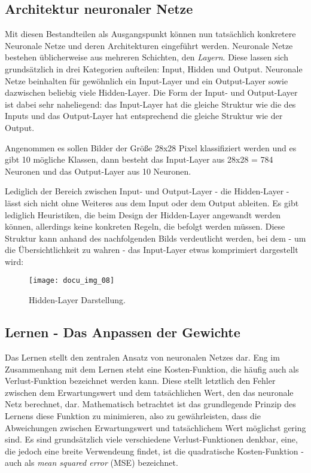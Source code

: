 \subsection{Architektur neuronaler Netze}

Mit diesen Bestandteilen als Ausgangspunkt können nun tatsächlich konkretere Neuronale Netze und deren Architekturen
eingeführt werden. Neuronale Netze bestehen üblicherweise aus mehreren Schichten, den \textit{Layern}. Diese lassen
sich grundsätzlich in drei Kategorien aufteilen: Input, Hidden und Output. Neuronale Netze beinhalten für gewöhnlich
ein Input-Layer und ein Output-Layer sowie dazwischen beliebig viele Hidden-Layer. Die Form der Input- und Output-Layer
ist dabei sehr naheliegend: das Input-Layer hat die gleiche Struktur wie die des Inputs und das Output-Layer hat
entsprechend die gleiche Struktur wie der Output.

Angenommen es sollen Bilder der Größe 28x28 Pixel klassifiziert werden und es gibt 10 mögliche Klassen, dann besteht das
Input-Layer aus 28x28 = 784 Neuronen und das Output-Layer aus 10 Neuronen.

Lediglich der Bereich zwischen Input- und Output-Layer - die Hidden-Layer - lässt sich nicht ohne Weiteres aus dem Input
oder dem Output ableiten. Es gibt lediglich Heuristiken, die beim Design der Hidden-Layer angewandt werden können,
allerdings keine konkreten Regeln, die befolgt werden müssen. Diese Struktur kann anhand des nachfolgenden Bilds
verdeutlicht werden, bei dem - um die Übersichtlichkeit zu wahren - das Input-Layer etwas komprimiert dargestellt wird:

\begin{figure}[h]
    \centering
    \texttt{[image: docu\_img\_08]}
    \caption{Hidden-Layer Darstellung.}
    \label{fig:hidden-layers}
\end{figure}

\subsection{Lernen - Das Anpassen der Gewichte}

Das Lernen stellt den zentralen Ansatz von neuronalen Netzes dar. Eng im Zusammenhang mit dem Lernen steht eine
Kosten-Funktion, die häufig auch als Verlust-Funktion bezeichnet werden kann. Diese stellt letztlich den Fehler zwischen
dem Erwartungswert und dem tatsächlichen Wert, den das neuronale Netz berechnet, dar. Mathematisch betrachtet ist das
grundlegende Prinzip des Lernens diese Funktion zu minimieren, also zu gewährleisten, dass die Abweichungen zwischen
Erwartungswert und tatsächlichem Wert möglichst gering sind. Es sind grundsätzlich viele verschiedene Verlust-Funktionen
denkbar, eine, die jedoch eine breite Verwendeung findet, ist die quadratische Kosten-Funktion - auch als \textit{mean squared
error} (MSE) bezeichnet.

